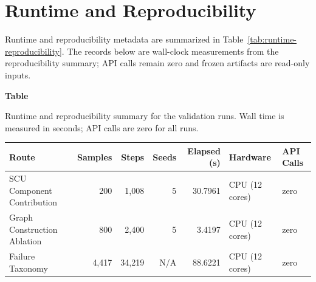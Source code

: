 \documentclass[a4paper,fleqn]{cas-sc}
\begin{document}
\section{Runtime and Reproducibility}
\label{app:runtime-reproducibility}

Runtime and reproducibility metadata are summarized in Table~\ref{tab:runtime-reproducibility}. The records below are wall-clock measurements from the reproducibility summary; API calls remain zero and frozen artifacts are read-only inputs.

\par\medskip
{}\label{tab:runtime-reproducibility}
\noindent\textbf{Table~\thetable}\par
\noindent Runtime and reproducibility summary for the validation runs. Wall time is measured in seconds; API calls are zero for all runs.
\begin{center}
\small
\begin{tabular}{lrrrrl l}
\toprule
Route & Samples & Steps & Seeds & Elapsed (s) & Hardware & API Calls \\
\midrule
SCU Component Contribution & 200 & 1,008 & 5 & 30.7961 & CPU (12 cores) & zero \\
Graph Construction Ablation & 800 & 2,400 & 5 & 3.4197 & CPU (12 cores) & zero \\
Failure Taxonomy & 4,417 & 34,219 & N/A & 88.6221 & CPU (12 cores) & zero \\
\bottomrule
\end{tabular}
\end{center}
\medskip


\clearpage


\end{document}
